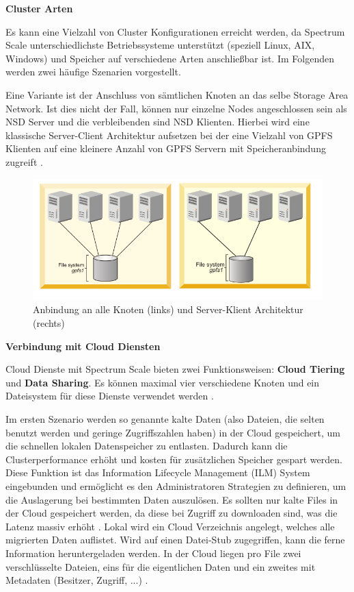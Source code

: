 \textbf{Cluster Arten}

Es kann eine Vielzahl von Cluster Konfigurationen erreicht werden, da Spectrum Scale unterschiedlichste Betriebssysteme unterstützt (speziell Linux, AIX, Windows) und Speicher auf verschiedene Arten anschließbar ist. Im Folgenden werden zwei häufige Szenarien vorgestellt.

Eine Variante ist der Anschluss von sämtlichen Knoten an das selbe Storage Area Network. Ist dies nicht der Fall, können nur einzelne Nodes angeschlossen sein als \ac{NSD} Server und die verbleibenden sind \ac{NSD} Klienten. Hierbei wird eine klassische Server-Client Architektur aufsetzen bei der eine Vielzahl von GPFS Klienten auf eine kleinere Anzahl von GPFS Servern mit Speicheranbindung zugreift \parencite[S. 8]{ibm.2017}.

\begin{figure}[hbt]
	\centering
	\includegraphics[scale=0.6]{images/gpfs-architectures}
	\caption{Anbindung an alle Knoten (links) und Server-Klient Architektur (rechts) \parencite[S. 8]{ibm.2017}}
	\label{fig:gpfsarchitecture}
\end{figure}

\textbf{Verbindung mit Cloud Diensten}

Cloud Dienste mit Spectrum Scale bieten zwei Funktionsweisen: \textbf{Cloud Tiering} und \textbf{Data Sharing}. Es können maximal vier verschiedene Knoten und ein Dateisystem für diese Dienste verwendet werden \parencite{mani.2017}.

Im ersten Szenario werden so genannte kalte Daten (also Dateien, die selten benutzt werden und geringe Zugriffszahlen haben) in der Cloud gespeichert, um die schnellen lokalen Datenspeicher zu entlasten. Dadurch kann die Clusterperformance erhöht und kosten für zusätzlichen Speicher gespart werden. Diese Funktion ist das Information Lifecycle Management (\ac{ILM}) System eingebunden und ermöglicht es den Administratoren Strategien zu definieren, um die Auslagerung bei bestimmten Daten auszulösen.
Es sollten nur kalte Files in der Cloud gespeichert werden, da diese bei Zugriff zu downloaden sind, was die Latenz massiv erhöht \parencite[S. 107]{ibm.2017}.
Lokal wird ein Cloud Verzeichnis angelegt, welches alle migrierten Daten auflistet. Wird auf einen Datei-Stub zugegriffen, kann die ferne Information heruntergeladen werden. In der Cloud liegen pro File zwei verschlüsselte Dateien, eins für die eigentlichen Daten und ein zweites mit Metadaten (Besitzer, Zugriff, ...) \parencite[S. 108]{ibm.2017}.

